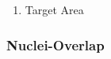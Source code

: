 \begin{enumerate}
\begin{enumerate}
  \item Target Area
  \end{enumerate}
  \begin{figure}[!ht]
    \centering
  \end{figure}
\end{enumerate}
\pagebreak
\subsubsection*{Nuclei-Overlap}

